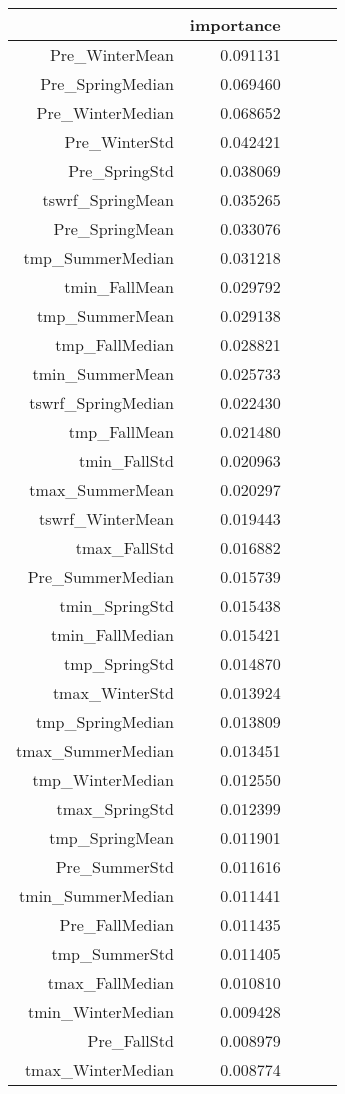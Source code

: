 \begin{tabular}{rrrrr}
\toprule
 & importance \\
\midrule
Pre_WinterMean & 0.091131 \\
Pre_SpringMedian & 0.069460 \\
Pre_WinterMedian & 0.068652 \\
Pre_WinterStd & 0.042421 \\
Pre_SpringStd & 0.038069 \\
tswrf_SpringMean & 0.035265 \\
Pre_SpringMean & 0.033076 \\
tmp_SummerMedian & 0.031218 \\
tmin_FallMean & 0.029792 \\
tmp_SummerMean & 0.029138 \\
tmp_FallMedian & 0.028821 \\
tmin_SummerMean & 0.025733 \\
tswrf_SpringMedian & 0.022430 \\
tmp_FallMean & 0.021480 \\
tmin_FallStd & 0.020963 \\
tmax_SummerMean & 0.020297 \\
tswrf_WinterMean & 0.019443 \\
tmax_FallStd & 0.016882 \\
Pre_SummerMedian & 0.015739 \\
tmin_SpringStd & 0.015438 \\
tmin_FallMedian & 0.015421 \\
tmp_SpringStd & 0.014870 \\
tmax_WinterStd & 0.013924 \\
tmp_SpringMedian & 0.013809 \\
tmax_SummerMedian & 0.013451 \\
tmp_WinterMedian & 0.012550 \\
tmax_SpringStd & 0.012399 \\
tmp_SpringMean & 0.011901 \\
Pre_SummerStd & 0.011616 \\
tmin_SummerMedian & 0.011441 \\
Pre_FallMedian & 0.011435 \\
tmp_SummerStd & 0.011405 \\
tmax_FallMedian & 0.010810 \\
tmin_WinterMedian & 0.009428 \\
Pre_FallStd & 0.008979 \\
tmax_WinterMedian & 0.008774 \\

\end{tabular}
